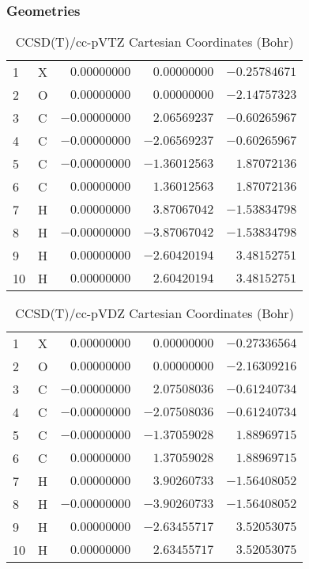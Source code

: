 \documentclass[10pt,oneside]{article}
\begin{document}
\clearpage

\subsection{\ \ \ }

\subsubsection*{Geometries}
\begin{table}[h!]
\centering
\caption{CCSD(T)/cc-pVTZ Cartesian Coordinates (Bohr)}
\begin{tabular}{llrrr}
1  & X  & $ 0.00000000$ & $ 0.00000000$ & $-0.25784671$ \\
2  & O  & $ 0.00000000$ & $ 0.00000000$ & $-2.14757323$ \\
3  & C  & $-0.00000000$ & $ 2.06569237$ & $-0.60265967$ \\
4  & C  & $-0.00000000$ & $-2.06569237$ & $-0.60265967$ \\
5  & C  & $-0.00000000$ & $-1.36012563$ & $ 1.87072136$ \\
6  & C  & $ 0.00000000$ & $ 1.36012563$ & $ 1.87072136$ \\
7  & H  & $ 0.00000000$ & $ 3.87067042$ & $-1.53834798$ \\
8  & H  & $-0.00000000$ & $-3.87067042$ & $-1.53834798$ \\
9  & H  & $ 0.00000000$ & $-2.60420194$ & $ 3.48152751$ \\
10 & H  & $ 0.00000000$ & $ 2.60420194$ & $ 3.48152751$ \\
\end{tabular}
\end{table}

\begin{table}[h!]
\centering
\caption{CCSD(T)/cc-pVDZ Cartesian Coordinates (Bohr)}
\begin{tabular}{llrrr}
1  & X  & $ 0.00000000$ & $ 0.00000000$ & $-0.27336564$ \\
2  & O  & $ 0.00000000$ & $ 0.00000000$ & $-2.16309216$ \\
3  & C  & $-0.00000000$ & $ 2.07508036$ & $-0.61240734$ \\
4  & C  & $-0.00000000$ & $-2.07508036$ & $-0.61240734$ \\
5  & C  & $-0.00000000$ & $-1.37059028$ & $ 1.88969715$ \\
6  & C  & $ 0.00000000$ & $ 1.37059028$ & $ 1.88969715$ \\
7  & H  & $ 0.00000000$ & $ 3.90260733$ & $-1.56408052$ \\
8  & H  & $-0.00000000$ & $-3.90260733$ & $-1.56408052$ \\
9  & H  & $ 0.00000000$ & $-2.63455717$ & $ 3.52053075$ \\
10 & H  & $ 0.00000000$ & $ 2.63455717$ & $ 3.52053075$ \\
\end{tabular}
\end{table}
\end{document}
